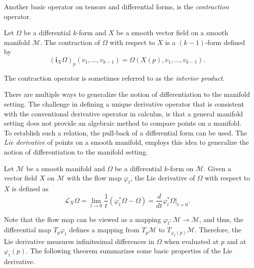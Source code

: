Another basic operator on tensors and differential forms, is the \emph{contraction} operator.
\begin{definition}
	Let $\Omega$ be a differential $k$-form and $X$ be a smooth vector field on a smooth manifold $\mathcal M$. The contraction of $\Omega$ with respect to $X$ is a $(k-1)$-form defined by
\[
	(\mathbf i_{X}\Omega)_p(v_1,\dots,v_{k-1}) = \Omega(X(p),v_1,\dots,v_{k-1}).
\]
\end{definition}
The contraction operator is sometimes referred to as the \emph{interior product}.

There are multiple ways to generalize the notion of differentiation to the manifold setting. The challenge in defining a unique derivative operator that is consistent with the conventional derivative operator in calculus, is that a general manifold setting does not provide an algebraic method to compare points on a manifold. To establish such a relation, the pull-back of a differential form can be used. The \emph{Lie derivative} of points on a smooth manifold, employs this idea to generalize the notion of differentiation to the manifold setting.
\begin{definition}
Let $\mathcal M$ be a smooth manifold and $\Omega$ be a differential $k$-form on $\mathcal M$. Given a vector field $X$ on $\mathcal M$ with the flow map $\varphi_t$, the Lie derivative of $\Omega$ with respect to $X$ is defined as
\begin{equation} \label{eq:2.10}
	\mathcal L_X \Omega = \lim_{t\to 0} \frac 1 t (\varphi^*_t \Omega - \Omega) = \frac {d}{dt} \varphi^*_t \Omega |_{t=0}.
\end{equation}
\end{definition}
Note that the flow map can be viewed as a mapping $\varphi_t:\mathcal M \to \mathcal M$, and thus, the differential map $T_p \varphi _t$ defines a mapping from $T_p \mathcal M$ to $T_{ \varphi_t(p) } \mathcal M$. Therefore, the Lie derivative measures infinitesimal differences in $\Omega$ when evaluated at $p$ and at $\varphi_t(p)$. The following theorem summarizes some basic properties of the Lie derivative.

